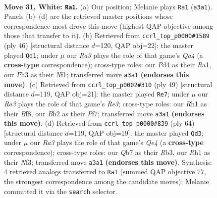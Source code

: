 \documentclass[11pt]{article}
\begin{document}
\clearpage

\begin{figure}[p]\centering
\begin{subfigure}{0.46\textwidth}\centering
\resizebox{\linewidth}{!}{%
\newchessgame
\chessboard[
  setfen={1n1qkb1r/1Q2n3/r1p3p1/p2p2P1/3P1PBp/RP5P/1BP5/3N1K1R w - - 5 31},
  showmover=false,
  pgfstyle=straightmove, color=movearrow, markmove={a3-a1}
]}
\caption{}
\end{subfigure}\hfill
\begin{subfigure}{0.46\textwidth}\centering
\resizebox{\linewidth}{!}{%
\newchessgame
\chessboard[
  setfen={r7/pb3rnk/3p2q1/2p2p1p/Q1P2P2/P1P1B2P/1R4P1/R4NK1 w - - 1 24},
  showmover=false,
  pgfstyle=straightmove, color=movearrow, markmove={a4-d1}
]}
\caption{}
\end{subfigure}
\\[4pt]
\begin{subfigure}{0.46\textwidth}\centering
\resizebox{\linewidth}{!}{%
\newchessgame
\chessboard[
  setfen={3q1bk1/1b3p2/p3r1pp/1pp1P2n/2P5/PB3N1P/1B2QPP1/4R1K1 b - - 1 25},
  showmover=false,
  pgfstyle=straightmove, color=movearrow, markmove={e6-e7}
]}
\caption{}
\end{subfigure}\hfill
\begin{subfigure}{0.46\textwidth}\centering
\resizebox{\linewidth}{!}{%
\newchessgame
\chessboard[
  setfen={1r2nbk1/3q1pp1/p2p3p/PnpP4/2B1Q3/1R3NPP/1P1B1P1K/8 w - - 1 33},
  showmover=false,
  pgfstyle=straightmove, color=movearrow, markmove={e4-d3}
]}
\caption{}
\end{subfigure}
\caption{\textbf{Move 31, White: \texttt{Ra1}.} (a) Our position; Melanie plays \texttt{Ra1} (\texttt{a3a1}). Panels (b)--(d) are the retrieved master positions whose correspondence most drove this move (highest QAP objective among those that transfer to it). (b) Retrieved from \texttt{ccrl\_top\_p0000\#1589} (ply 46) [structural distance $d$=120, QAP obj=22]: the master played \texttt{Qd1}; under $\mu$ our \emph{Ra3} plays the role of that game's \emph{Qa4} (a \textbf{cross-type} correspondence); cross-type roles: our \emph{P}d4 as their \emph{R}a1, our \emph{P}h3 as their \emph{N}f1; transferred move \texttt{a3a1} \textbf{(endorses this move)}. (c) Retrieved from \texttt{ccrl\_top\_p0002\#310} (ply 49) [structural distance $d$=119, QAP obj=21]: the master played \texttt{Re7}; under $\mu$ our \emph{Ra3} plays the role of that game's \emph{Re3}; cross-type roles: our \emph{R}h1 as their \emph{B}f8, our \emph{B}b2 as their \emph{P}f7; transferred move \texttt{a3a1} \textbf{(endorses this move)}. (d) Retrieved from \texttt{ccrl\_top\_p0000\#839} (ply 64) [structural distance $d$=119, QAP obj=19]: the master played \texttt{Qd3}; under $\mu$ our \emph{Ra3} plays the role of that game's \emph{Qe4} (a \textbf{cross-type} correspondence); cross-type roles: our \emph{Q}b7 as their \emph{R}b3, our \emph{R}h1 as their \emph{N}f3; transferred move \texttt{a3a1} \textbf{(endorses this move)}. Synthesis: 4 retrieved analogs transferred to \texttt{Ra1} (summed QAP objective 77, the strongest correspondence among the candidate moves); Melanie committed it via the \texttt{search} selector.}
\label{fig:thought-m60}
\end{figure}
\end{document}
